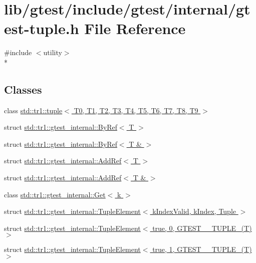\hypertarget{gtest-tuple_8h}{\section{lib/gtest/include/gtest/internal/gtest-\/tuple.h File Reference}
\label{gtest-tuple_8h}
}
{\ttfamily \#include $<$utility$>$}\\*
\subsection*{Classes}
\begin{DoxyCompactItemize}
\item 
class \hyperlink{classstd_1_1tr1_1_1tuple}{std\-::tr1\-::tuple$<$ T0, T1, T2, T3, T4, T5, T6, T7, T8, T9 $>$}
\item 
struct \hyperlink{structstd_1_1tr1_1_1gtest__internal_1_1_by_ref}{std\-::tr1\-::gtest\-\_\-internal\-::\-By\-Ref$<$ T $>$}
\item 
struct \hyperlink{structstd_1_1tr1_1_1gtest__internal_1_1_by_ref_3_01_t_01_6_01_4}{std\-::tr1\-::gtest\-\_\-internal\-::\-By\-Ref$<$ T \& $>$}
\item 
struct \hyperlink{structstd_1_1tr1_1_1gtest__internal_1_1_add_ref}{std\-::tr1\-::gtest\-\_\-internal\-::\-Add\-Ref$<$ T $>$}
\item 
struct \hyperlink{structstd_1_1tr1_1_1gtest__internal_1_1_add_ref_3_01_t_01_6_01_4}{std\-::tr1\-::gtest\-\_\-internal\-::\-Add\-Ref$<$ T \& $>$}
\item 
class \hyperlink{classstd_1_1tr1_1_1gtest__internal_1_1_get}{std\-::tr1\-::gtest\-\_\-internal\-::\-Get$<$ k $>$}
\item 
struct \hyperlink{structstd_1_1tr1_1_1gtest__internal_1_1_tuple_element}{std\-::tr1\-::gtest\-\_\-internal\-::\-Tuple\-Element$<$ k\-Index\-Valid, k\-Index, Tuple $>$}
\item 
struct \hyperlink{structstd_1_1tr1_1_1gtest__internal_1_1_tuple_element_3_01true_00_010_00_01_g_t_e_s_t__10___t_u_p_l_e___07_t_08_01_4}{std\-::tr1\-::gtest\-\_\-internal\-::\-Tuple\-Element$<$ true, 0, G\-T\-E\-S\-T\-\_\-\_\-\-T\-U\-P\-L\-E\-\_\-(\-T) $>$}
\item 
struct \hyperlink{structstd_1_1tr1_1_1gtest__internal_1_1_tuple_element_3_01true_00_011_00_01_g_t_e_s_t__10___t_u_p_l_e___07_t_08_01_4}{std\-::tr1\-::gtest\-\_\-internal\-::\-Tuple\-Element$<$ true, 1, G\-T\-E\-S\-T\-\_\-\_\-\-T\-U\-P\-L\-E\-\_\-(\-T) $>$}

\end{DoxyCompactItemize}
